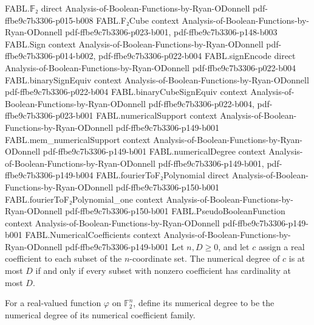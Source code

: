 \begin{theorem}
\label{FABL.numericalDegree_le_iff}
\leanok
{}
\proofstep
  {FABL.𝔽₂}
  {direct}
  {Analysis-of-Boolean-Functions-by-Ryan-ODonnell}
  {pdf-ffbe9c7b3306-p015-b008}
\proofstep
  {FABL.F₂Cube}
  {context}
  {Analysis-of-Boolean-Functions-by-Ryan-ODonnell}
  {pdf-ffbe9c7b3306-p023-b001,
    pdf-ffbe9c7b3306-p148-b003}
\proofstep
  {FABL.Sign}
  {context}
  {Analysis-of-Boolean-Functions-by-Ryan-ODonnell}
  {pdf-ffbe9c7b3306-p014-b002,
    pdf-ffbe9c7b3306-p022-b004}
\proofstep
  {FABL.signEncode}
  {direct}
  {Analysis-of-Boolean-Functions-by-Ryan-ODonnell}
  {pdf-ffbe9c7b3306-p022-b004}
\proofstep
  {FABL.binarySignEquiv}
  {context}
  {Analysis-of-Boolean-Functions-by-Ryan-ODonnell}
  {pdf-ffbe9c7b3306-p022-b004}
\proofstep
  {FABL.binaryCubeSignEquiv}
  {context}
  {Analysis-of-Boolean-Functions-by-Ryan-ODonnell}
  {pdf-ffbe9c7b3306-p022-b004,
    pdf-ffbe9c7b3306-p023-b001}
\proofstep
  {FABL.numericalSupport}
  {context}
  {Analysis-of-Boolean-Functions-by-Ryan-ODonnell}
  {pdf-ffbe9c7b3306-p149-b001}
\proofstep
  {FABL.mem_numericalSupport}
  {context}
  {Analysis-of-Boolean-Functions-by-Ryan-ODonnell}
  {pdf-ffbe9c7b3306-p149-b001}
\proofstep
  {FABL.numericalDegree}
  {context}
  {Analysis-of-Boolean-Functions-by-Ryan-ODonnell}
  {pdf-ffbe9c7b3306-p149-b001,
    pdf-ffbe9c7b3306-p149-b004}
\proofstep
  {FABL.fourierToF₂Polynomial}
  {direct}
  {Analysis-of-Boolean-Functions-by-Ryan-ODonnell}
  {pdf-ffbe9c7b3306-p150-b001}
\proofstep
  {FABL.fourierToF₂Polynomial_one}
  {context}
  {Analysis-of-Boolean-Functions-by-Ryan-ODonnell}
  {pdf-ffbe9c7b3306-p150-b001}
\proofstep
  {FABL.PseudoBooleanFunction}
  {context}
  {Analysis-of-Boolean-Functions-by-Ryan-ODonnell}
  {pdf-ffbe9c7b3306-p149-b001}
\proofstep
  {FABL.NumericalCoefficients}
  {context}
  {Analysis-of-Boolean-Functions-by-Ryan-ODonnell}
  {pdf-ffbe9c7b3306-p149-b001}
Let $n,D\ge 0$, and let $c$ assign a real coefficient to each subset of the
$n$-coordinate set. The numerical degree of $c$ is at most $D$ if and only if every
subset with nonzero coefficient has cardinality at most $D$.
\end{theorem}

\begin{definition}
\label{FABL.functionNumericalDegree}
\leanok
{}
For a real-valued function $\varphi$ on $\mathbb F_2^n$, define its numerical degree
to be the numerical degree of its numerical coefficient family.
\end{definition}

